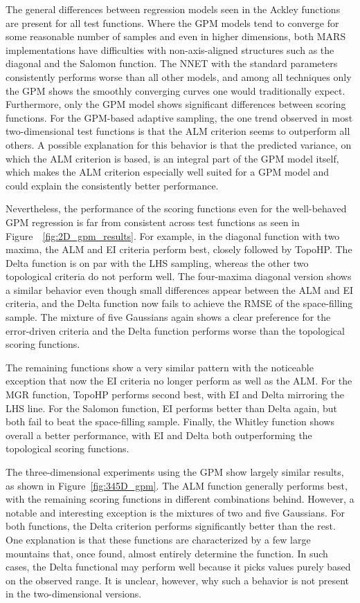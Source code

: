 The general differences between regression models seen in the Ackley functions are present for all test functions.
%
Where the GPM models tend to converge for some reasonable number of samples and even in higher dimensions, both MARS implementations have difficulties with non-axis-aligned structures such as the diagonal and the Salomon function.
%
The NNET with the standard parameters consistently performs worse than all other models, and among all techniques only the GPM shows the smoothly converging curves one would traditionally expect.
%
Furthermore, only the GPM model shows significant differences between scoring functions.
%
For the GPM-based adaptive sampling, the one trend observed in most two-dimensional test functions is that the ALM criterion seems to outperform all others.
%
A possible explanation for this behavior is that the predicted variance, on which the ALM criterion is based, is an integral part of the GPM model itself, which makes the ALM criterion especially well suited for a GPM model and could explain the consistently better performance.

Nevertheless, the performance of the scoring functions even for the well-behaved GPM regression is far from consistent across test functions as seen in Figure~~\ref{fig:2D_gpm_results}.
%
For example, in the diagonal function with two maxima, the ALM and EI criteria perform best, closely followed by TopoHP.
%
The Delta function is on par with the LHS sampling, whereas the other two topological criteria do not perform well.
%
The four-maxima diagonal version shows a similar behavior even though small differences appear between the ALM and EI criteria, and the Delta function now fails to achieve the RMSE of the space-filling sample.
%
The mixture of five Gaussians again shows a clear preference for the error-driven criteria and the Delta function performs worse than the topological scoring functions.

The remaining functions show a very similar pattern with the noticeable exception that now the EI criteria no longer perform as well as the ALM.
%
For the MGR function, TopoHP performs second best, with EI and Delta mirroring the LHS line.
%
For the Salomon function, EI performs better than Delta again, but both fail to beat the space-filling sample.
%
Finally, the Whitley function shows overall a better performance, with EI and Delta both outperforming the topological scoring functions.

The three-dimensional experiments using the GPM show largely similar results, as shown in
Figure~\ref{fig:345D_gpm}.
%
The ALM function generally performs best, with the remaining scoring functions in different combinations behind.
%
However, a notable and interesting exception is the mixtures of two and five Gaussians.
%
For both functions, the Delta criterion performs significantly better than the rest.
%
One explanation is that these functions are characterized by a few large mountains
that, once found, almost entirely determine the function.
%
In such cases, the Delta functional may perform well because it picks values purely based on the observed range.
%
It is unclear, however, why such a behavior is not present in the two-dimensional versions.

